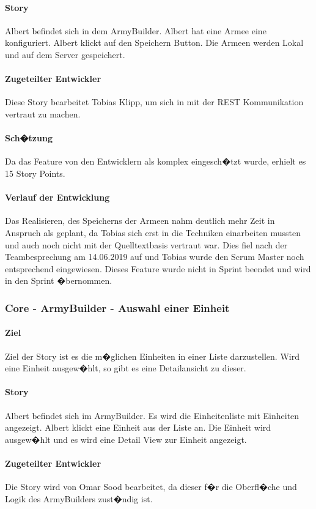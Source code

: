 \documentclass[12pt, titlepage]{scrartcl}
\newcommand{\RN}[1]{%
	\textup{\uppercase\expandafter{\romannumeral#1}}%
}
\begin{document}
		\paragraph{Story} Albert befindet sich in dem ArmyBuilder. Albert hat eine Armee eine konfiguriert. Albert klickt auf den Speichern Button. Die Armeen werden Lokal und auf dem Server gespeichert.
		\paragraph{Zugeteilter Entwickler} Diese Story bearbeitet Tobias Klipp, um sich in mit der REST Kommunikation vertraut zu machen.
		\paragraph{Sch�tzung}
		Da das Feature von den Entwicklern als komplex eingesch�tzt wurde, erhielt es 15 Story Points.
		\paragraph{Verlauf der Entwicklung} Das Realisieren, des Speicherns der Armeen nahm deutlich mehr Zeit in Anspruch als geplant, da Tobias sich erst in die Techniken einarbeiten mussten und auch noch nicht mit der Quelltextbasis vertraut war. Dies fiel nach der Teambesprechung am 14.06.2019 auf und Tobias wurde den Scrum Master noch entsprechend eingewiesen. Dieses Feature wurde nicht in Sprint \RN{3} beendet und wird in den Sprint \RN{4} �bernommen.
		
		\subsubsection{Core - ArmyBuilder - Auswahl einer Einheit}
		\paragraph{Ziel} Ziel der Story ist es die m�glichen Einheiten in einer Liste darzustellen. Wird eine Einheit ausgew�hlt, so gibt es eine Detailansicht zu dieser.
		\paragraph{Story} Albert befindet sich im ArmyBuilder. Es wird die Einheitenliste mit Einheiten angezeigt. Albert klickt eine Einheit aus der Liste an. Die Einheit wird ausgew�hlt und es wird eine Detail View zur Einheit angezeigt.
		\paragraph{Zugeteilter Entwickler} Die Story wird von Omar Sood bearbeitet, da dieser f�r die Oberfl�che und Logik des ArmyBuilders zust�ndig ist.
\end{document}
